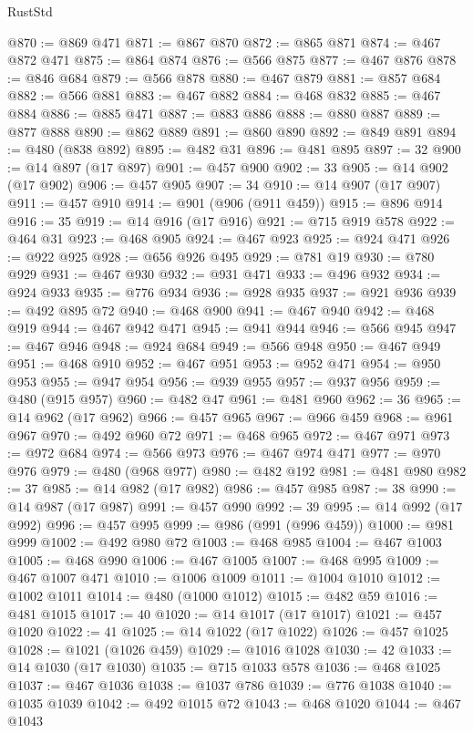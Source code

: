 \begin{lexlean}{RustStd}
\begin{coremodule}
{\begin{coremodule}
{{{{{{{{{{{{{{{{{{{{{{{{{{{{{{{{{@870 := @869 @471
@871 := @867 @870
@872 := @865 @871
@874 := @467 @872 @471
@875 := @864 @874
@876 := @566 @875
@877 := @467 @876
@878 := @846 @684
@879 := @566 @878
@880 := @467 @879
@881 := @857 @684
@882 := @566 @881
@883 := @467 @882
@884 := @468 @832
@885 := @467 @884
@886 := @885 @471
@887 := @883 @886
@888 := @880 @887
@889 := @877 @888
@890 := @862 @889
@891 := @860 @890
@892 := @849 @891
@894 := @480 (@838 @892)
@895 := @482 @31
@896 := @481 @895
@897 := 32
@900 := @14 @897 (@17 @897)
@901 := @457 @900
@902 := 33
@905 := @14 @902 (@17 @902)
@906 := @457 @905
@907 := 34
@910 := @14 @907 (@17 @907)
@911 := @457 @910
@914 := @901 (@906 (@911 @459))
@915 := @896 @914
@916 := 35
@919 := @14 @916 (@17 @916)
@921 := @715 @919 @578
@922 := @464 @31
@923 := @468 @905
@924 := @467 @923
@925 := @924 @471
@926 := @922 @925
@928 := @656 @926 @495
@929 := @781 @19
@930 := @780 @929
@931 := @467 @930
@932 := @931 @471
@933 := @496 @932
@934 := @924 @933
@935 := @776 @934
@936 := @928 @935
@937 := @921 @936
@939 := @492 @895 @72
@940 := @468 @900
@941 := @467 @940
@942 := @468 @919
@944 := @467 @942 @471
@945 := @941 @944
@946 := @566 @945
@947 := @467 @946
@948 := @924 @684
@949 := @566 @948
@950 := @467 @949
@951 := @468 @910
@952 := @467 @951
@953 := @952 @471
@954 := @950 @953
@955 := @947 @954
@956 := @939 @955
@957 := @937 @956
@959 := @480 (@915 @957)
@960 := @482 @47
@961 := @481 @960
@962 := 36
@965 := @14 @962 (@17 @962)
@966 := @457 @965
@967 := @966 @459
@968 := @961 @967
@970 := @492 @960 @72
@971 := @468 @965
@972 := @467 @971
@973 := @972 @684
@974 := @566 @973
@976 := @467 @974 @471
@977 := @970 @976
@979 := @480 (@968 @977)
@980 := @482 @192
@981 := @481 @980
@982 := 37
@985 := @14 @982 (@17 @982)
@986 := @457 @985
@987 := 38
@990 := @14 @987 (@17 @987)
@991 := @457 @990
@992 := 39
@995 := @14 @992 (@17 @992)
@996 := @457 @995
@999 := @986 (@991 (@996 @459))
@1000 := @981 @999
@1002 := @492 @980 @72
@1003 := @468 @985
@1004 := @467 @1003
@1005 := @468 @990
@1006 := @467 @1005
@1007 := @468 @995
@1009 := @467 @1007 @471
@1010 := @1006 @1009
@1011 := @1004 @1010
@1012 := @1002 @1011
@1014 := @480 (@1000 @1012)
@1015 := @482 @59
@1016 := @481 @1015
@1017 := 40
@1020 := @14 @1017 (@17 @1017)
@1021 := @457 @1020
@1022 := 41
@1025 := @14 @1022 (@17 @1022)
@1026 := @457 @1025
@1028 := @1021 (@1026 @459)
@1029 := @1016 @1028
@1030 := 42
@1033 := @14 @1030 (@17 @1030)
@1035 := @715 @1033 @578
@1036 := @468 @1025
@1037 := @467 @1036
@1038 := @1037 @786
@1039 := @776 @1038
@1040 := @1035 @1039
@1042 := @492 @1015 @72
@1043 := @468 @1020
@1044 := @467 @1043
}}}}}}}}}}}}}}}}}}}}}}}}}}}}}}}}}
\end{coremodule}}
\end{coremodule}
\end{lexlean}
